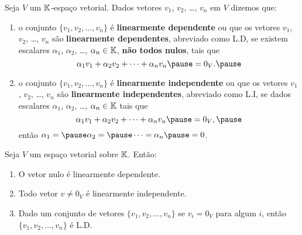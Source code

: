 \documentclass{beamer}
\begin{document}
\begin{frame}
  \begin{definicao}
    Seja $V$ um $\mathbb{K}$-espaço vetorial. \pause Dados vetores $v_1$, $v_2$, \dots, $v_n$ \pause em $V$ dizemos que:\pause
    \begin{enumerate}[label={\roman*})]
      \item o conjunto $\{v_1, v_2, \dots, v_n\}$ \pause é \textbf{linearmente dependente} \pause ou que os vetores $v_1$, $v_2$, \dots, $v_n$ são \textbf{linearmente dependentes}, \pause abreviado como L.D, \pause se existem escalares
        $\alpha_1$, $\alpha_2$, \dots, $\alpha_n \in \mathbb{K}$, \pause \textbf{não todos nulos}, \pause tais que\pause
        \[
            \alpha_1v_1 + \alpha_2v_2 + \cdots + \alpha_nv_n \pause = 0_V.\pause
        \]

      \item o conjunto $\{v_1, v_2, \dots, v_n\}$ \pause é \textbf{linearmente independente} \pause ou que os vetores $v_1$, $v_2$, \dots, $v_n$ são \textbf{linearmente independentes}, \pause abreviado como L.I, \pause se dados escalares
        $\alpha_1$, $\alpha_2$, \dots, $\alpha_n \in \mathbb{K}$  tais que\pause
        \[
            \alpha_1v_1 + \alpha_2v_2 + \cdots + \alpha_nv_n \pause = 0_V,\pause
        \]
        então $\alpha_1 = \pause \alpha_2 = \pause \cdots = \alpha_n \pause = 0$.
    \end{enumerate}
  \end{definicao}
\end{frame}


\begin{frame}
  \begin{proposicao}
  Seja $V$ um espaço vetorial sobre $\mathbb{K}$. Então:\pause

  \begin{enumerate}[label={\roman*})]
    \item O vetor nulo é linearmente dependente.\pause

    \vspace{.3cm}

    \item Todo vetor $v \ne 0_V$ \pause é linearmente independente.\pause

    \vspace{.3cm}

    \item Dado um conjunto de vetores $\{v_1, v_2, \dots, v_n\}$ \pause se $v_i = 0_V$ para algum $i$, \pause então $\{v_1, v_2, \dots, v_n\}$ é L.D.

    \seti
  \end{enumerate}
  \end{proposicao}
\end{frame}
\end{document}
